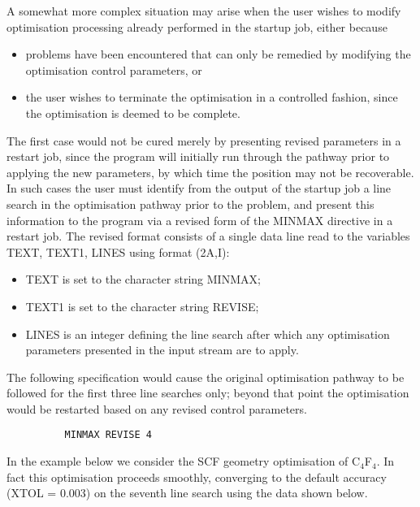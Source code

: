\documentclass[11pt,fleqn]{article}
\begin{document}
A somewhat more complex situation may arise when the user wishes
to modify optimisation processing already performed in the
startup job, either because
\begin{itemize}
\item problems have been encountered that can only be remedied by
modifying the optimisation control parameters, or
\item the user wishes to terminate the optimisation in a controlled
fashion, since the optimisation is deemed to be complete.
\end{itemize}
The first case would not be cured merely by presenting revised
parameters in a restart job, since the program will initially
run through the pathway prior to applying the new parameters, by
which time the position may not be recoverable. In such cases the
user must identify from the output of the startup job 
a line search in the optimisation pathway prior to the problem, and
present this information to the program via a revised form of the
MINMAX directive in a restart job. The revised format 
consists of a single 
data line read to the variables TEXT, TEXT1, LINES using format (2A,I):
\begin{itemize}
\item TEXT is set to the character string MINMAX;
\item TEXT1 is set to the character string REVISE;
\item LINES is an integer defining the line search after which
any optimisation parameters presented in the input stream
are to apply.
\end{itemize}
The following specification  would cause the original optimisation
pathway to be followed for the first three line searches only;  beyond
that point the optimisation would be restarted based on any revised
control parameters.

{
\footnotesize
\begin{verbatim}
          MINMAX REVISE 4
\end{verbatim}
}
In the example below we consider the SCF geometry optimisation of
C$_{4}$F$_{4}$. In fact this optimisation proceeds smoothly,
converging to the default accuracy (XTOL = 0.003) on the
seventh line search using the data shown below.
\end{document}
